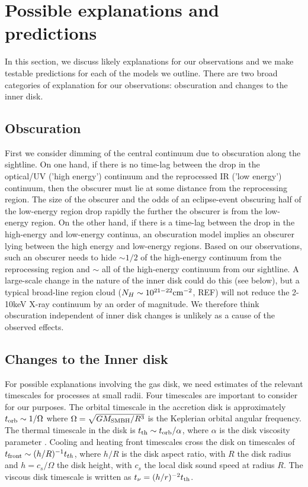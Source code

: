 \documentclass{mnras}
\begin{document}
\section{Possible explanations and predictions}
\label{sec:explanations}
In this section, we discuss likely explanations for our observations and we make testable predictions for each of the models we outline. 
There are two broad categories of explanation for our observations: obscuration and changes to the inner disk.

\subsection{Obscuration}
First we consider dimming of the central continuum due to obscuration along the sightline. On one hand, if there is no time-lag between the drop in the  optical/UV ('high energy') continuum and the reprocessed IR ('low energy') continuum, then the obscurer must lie at some distance from the reprocessing region. The size of the obscurer and the odds of an eclipse-event obscuring half of the low-energy region drop rapidly the further the obscurer is from the low-energy region. On the other hand, if there is a time-lag between the drop in the high-energy and low-energy continua, an obscuration model implies an obscurer lying between the high energy and low-energy regions.  Based on our observations, such an obscurer needs to hide $\sim 1/2$ of the high-energy continuum from the reprocessing region and $\sim$ all of the high-energy continuum from our sightline. A large-scale change in the nature of the inner disk could do this (see below), but a typical broad-line region cloud ($N_{H} \sim 10^{21-22}\rm{cm}^{-2}$, REF) will not reduce the 2-10keV X-ray continuum by an order of magnitude. We therefore think obscuration independent of inner disk changes is unlikely as a cause of the observed effects. 

\subsection{Changes to the Inner disk}
\label{sec:times}
For possible explanations involving the gas disk, we need estimates of the relevant timescales for processes at small radii. Four timescales are important to consider for our purposes. The orbital timescale in the accretion disk is approximately $t_{\rm orb} \sim 1/\Omega$ where $\Omega=\sqrt{GM_{\rm SMBH}/R^{3}}$ is the Keplerian orbital angular frequency. The thermal timescale in the disk is $t_{\rm th} \sim t_{\rm orb}/\alpha$, where $\alpha$ is the disk viscosity parameter \citep{Shakura73}. Cooling and heating front timescales cross the disk on timescales of $t_{\rm front} \sim (h/R)^{-1} t_{th}$, where $h/R$ is the disk aspect ratio, with $R$ the disk radius and $h=c_{s}/\Omega$ the disk height, with $c_{s}$ the local disk sound speed at radius $R$. The viscous disk timescale is written as $t_{\nu}=(h/r)^{-2}t_{\rm th}$. 
\end{document}
